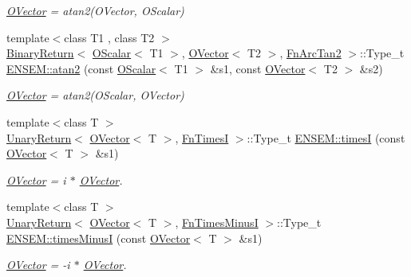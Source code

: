 \begin{DoxyCompactItemize}
\begin{DoxyCompactList}\small\item\em \mbox{\hyperlink{classENSEM_1_1OVector}{O\+Vector}} = atan2(\+O\+Vector, O\+Scalar) \end{DoxyCompactList}\item 
{\footnotesize template$<$class T1 , class T2 $>$ }\\\mbox{\hyperlink{structENSEM_1_1BinaryReturn}{Binary\+Return}}$<$ \mbox{\hyperlink{classENSEM_1_1OScalar}{O\+Scalar}}$<$ T1 $>$, \mbox{\hyperlink{classENSEM_1_1OVector}{O\+Vector}}$<$ T2 $>$, \mbox{\hyperlink{structENSEM_1_1FnArcTan2}{Fn\+Arc\+Tan2}} $>$\+::Type\+\_\+t \mbox{\hyperlink{group__obsvector_gaf9e56538a48f9abad6df1dda8297795b}{E\+N\+S\+E\+M\+::atan2}} (const \mbox{\hyperlink{classENSEM_1_1OScalar}{O\+Scalar}}$<$ T1 $>$ \&s1, const \mbox{\hyperlink{classENSEM_1_1OVector}{O\+Vector}}$<$ T2 $>$ \&s2)
\begin{DoxyCompactList}\small\item\em \mbox{\hyperlink{classENSEM_1_1OVector}{O\+Vector}} = atan2(\+O\+Scalar, O\+Vector) \end{DoxyCompactList}\item 
{\footnotesize template$<$class T $>$ }\\\mbox{\hyperlink{structENSEM_1_1UnaryReturn}{Unary\+Return}}$<$ \mbox{\hyperlink{classENSEM_1_1OVector}{O\+Vector}}$<$ T $>$, \mbox{\hyperlink{structENSEM_1_1FnTimesI}{Fn\+TimesI}} $>$\+::Type\+\_\+t \mbox{\hyperlink{group__obsvector_gae21f93a0579f899ea525fd69333d5381}{E\+N\+S\+E\+M\+::timesI}} (const \mbox{\hyperlink{classENSEM_1_1OVector}{O\+Vector}}$<$ T $>$ \&s1)
\begin{DoxyCompactList}\small\item\em \mbox{\hyperlink{classENSEM_1_1OVector}{O\+Vector}} = i $\ast$ \mbox{\hyperlink{classENSEM_1_1OVector}{O\+Vector}}. \end{DoxyCompactList}\item 
{\footnotesize template$<$class T $>$ }\\\mbox{\hyperlink{structENSEM_1_1UnaryReturn}{Unary\+Return}}$<$ \mbox{\hyperlink{classENSEM_1_1OVector}{O\+Vector}}$<$ T $>$, \mbox{\hyperlink{structENSEM_1_1FnTimesMinusI}{Fn\+Times\+MinusI}} $>$\+::Type\+\_\+t \mbox{\hyperlink{group__obsvector_ga54c8e8c422afecbe2b647d021d931efb}{E\+N\+S\+E\+M\+::times\+MinusI}} (const \mbox{\hyperlink{classENSEM_1_1OVector}{O\+Vector}}$<$ T $>$ \&s1)
\begin{DoxyCompactList}\small\item\em \mbox{\hyperlink{classENSEM_1_1OVector}{O\+Vector}} = -\/i $\ast$ \mbox{\hyperlink{classENSEM_1_1OVector}{O\+Vector}}. \end{DoxyCompactList}\item 

\end{DoxyCompactItemize}

